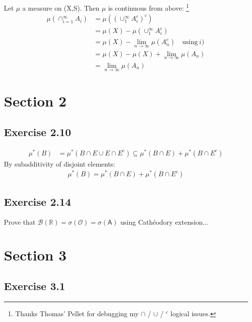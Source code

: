 \documentclass[11pt]{article}
\numberwithin{equation}{section}
\theoremstyle{plain}
\theoremstyle{definition}
\newcommand\parens[1]{\left( #1 \right)}
\newcommand{\1}{\mathbbm 1}
\def\s{\sigma}
\newcommand{\RR}{\mathbb R}
\renewcommand{\AA}{\mathsf A}
\newcommand{\oO}{\mathcal O}
\newcommand{\bB}{\mathcal B}
\begin{document}
Let $\mu$ a measure on (X,S). Then $\mu$ is continuous from above: \footnote{Thanks Thomas' Pellet for debugging my $\cap$ / $\cup$ / $^c$ logical issues.}\\ 
\begin{align*}
	\mu (\cap^\infty_{i=1} A_i) &= \mu \parens{\parens{\cup^\infty_1 A^c_i}^c} \\
						   &=  \mu (X) - \mu \parens{\cup^\infty_1 A^c_i}\\
						   &= \mu (X) - \lim_{n \to \infty} \mu \parens{A^c_n} \quad \text{using} \ i) \\
						   &= \mu (X) - \mu (X) +\lim_{n \to \infty} \mu \parens{A_n} \\
						   &=  \lim_{n \to \infty} \mu \parens{A_n}
\end{align*}




\section*{Section 2} %
\label{sec:section_2}

\subsection*{Exercise 2.10} %

\begin{align*}
	\mu^{*}(B) &= \mu^{*}(B \cap E \cup E \cap E^c) \subseteq \mu^{*}(B \cap E) + \mu^{*}(B \cap E^c)
\end{align*}
By subadditivity of disjoint elements:
\begin{align*}
	\mu^{*}(B) = \mu^{*}(B \cap E) + \mu^{*}(B \cap E^c)
\end{align*}



\subsection*{Exercise 2.14} %
Prove that $\bB (\RR) = \s (\oO) = \s (\AA)$ using Cathéodory extension...



\section*{Section 3} %
\label{sec:section_3}

\subsection*{Exercise 3.1} %
\end{document}
